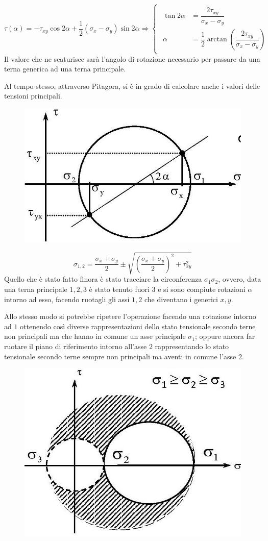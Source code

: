 \documentclass{article}
\begin{document}
\begin{adjustwidth}{2in}{}
	\[
		\tau(\alpha) = -\tau_{xy} \cos2\alpha + \frac{1}{2}(\sigma_x -\sigma_y) \sin2\alpha \Rightarrow \begin{cases}
			\begin{aligned}
			\tan2\alpha & = \dfrac{2\tau_{xy}}{\sigma_x -\sigma_y} \\
			\alpha & = \dfrac{1}{2} \arctan \left(\dfrac{2\tau_{xy}}{\sigma_x -\sigma_y} \right) 
			\end{aligned}
		\end{cases}
	\]
	Il valore che ne scaturisce sarà l'angolo di rotazione necessario per passare da una terna generica ad una terna principale. \newline
	
	Al tempo stesso, attraverso Pitagora, si è in grado di calcolare anche i valori delle tensioni principali.
	
\begin{figure}[H]
	\centering
	\includegraphics[width=0.4\linewidth]{immagini/1.PARTE7_Pagina_41}
\end{figure} 
	\[
	\sigma_{1,2} = \frac{\sigma_x + \sigma_y}{2} \pm \sqrt{\left( \frac{\sigma_x + \sigma_y}{2} \right)^2 + \tau_{xy}^2 }
	\]
	\newpage
	Quello che è stato fatto finora è stato tracciare la circonferenza $\sigma_1\sigma_2$, ovvero, data una terna principale $1,2,3$ è stato tenuto fuori $3$ e si sono compiute rotazioni $\alpha$ intorno ad esso, facendo ruotagli gli assi $1,2$ che diventano i generici $x,y$. 
	
	Allo stesso modo si potrebbe ripetere l'operazione facendo una rotazione intorno ad $1$ ottenendo così diverse rappresentazioni dello stato tensionale secondo terne non principali ma che hanno in comune un asse principale $\sigma_1$; oppure ancora far ruotare il piano di riferimento intorno all'asse $2$ rappresentando lo stato tensionale secondo terne sempre non principali ma aventi in comune l'asse $2$. 

\begin{figure}[H]
	\centering
	\includegraphics[width=0.4\linewidth]{immagini/1.PARTE7_Pagina_42 (2)}
\end{figure}	


\end{adjustwidth}
\end{document}
